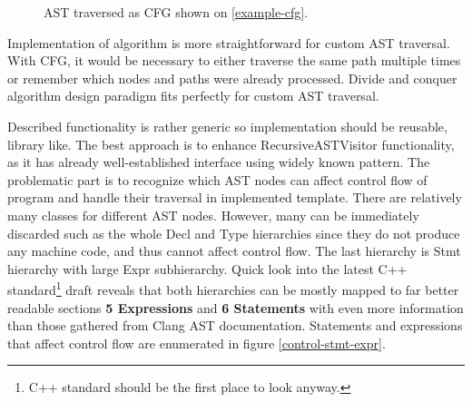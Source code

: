 \begin{figure}[h!]
\caption{AST traversed as CFG shown on \ref{example-cfg}.}
\vspace{.5cm}
\centering
{}
\end{figure}

Implementation of algorithm is more straightforward for custom AST traversal. With CFG, it would be necessary to either traverse the same path multiple times or remember which nodes and paths were already processed. Divide and conquer algorithm design paradigm fits perfectly for custom AST traversal.

Described functionality is rather generic so implementation should be reusable, library like. The best approach is to enhance RecursiveASTVisitor functionality, as it has already well-established interface using widely known pattern. The problematic part is to recognize which AST nodes can affect control flow of program and handle their traversal in implemented template. There are relatively many classes for different AST nodes. However, many can be immediately discarded such as the whole Decl and Type hierarchies since they do not produce any machine code, and thus cannot affect control flow. The last hierarchy is Stmt hierarchy with large Expr subhierarchy. Quick look into the latest C++ standard\footnote{C++ standard should be the first place to look anyway.} draft reveals that both hierarchies can be mostly mapped to far better readable sections \textbf{5 Expressions} and \textbf{6 Statements} with even more information than those gathered from Clang AST documentation. Statements and expressions that affect control flow are enumerated in figure \ref{control-stmt-expr}.

